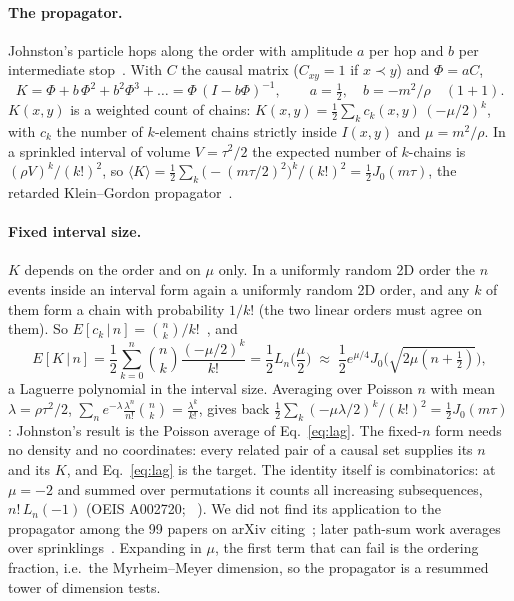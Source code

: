 \documentclass[11pt,a4paper]{article}
\begin{document}
\paragraph{The propagator.} Johnston's particle hops along the order with amplitude $a$ per hop and $b$ per intermediate stop~\cite{Johnston08}. With $C$ the causal matrix ($C_{xy}=1$ if $x\prec y$) and $\Phi=aC$,
\begin{equation}
K=\Phi+b\,\Phi^2+b^2\Phi^3+\dots=\Phi\,(I-b\Phi)^{-1},\qquad a=\tfrac12,\quad b=-m^2/\rho\quad(1+1).
\end{equation}
$K(x,y)$ is a weighted count of chains: $K(x,y)=\tfrac12\sum_k c_k(x,y)\,(-\mu/2)^k$, with $c_k$ the number of $k$-element chains strictly inside $I(x,y)$ and $\mu=m^2/\rho$. In a sprinkled interval of volume $V=\tau^2/2$ the expected number of $k$-chains is $(\rho V)^k/(k!)^2$, so $\langle K\rangle=\tfrac12\sum_k\big(-(m\tau/2)^2\big)^k/(k!)^2=\tfrac12J_0(m\tau)$, the retarded Klein--Gordon propagator~\cite{Johnston08}.

\paragraph{Fixed interval size.} $K$ depends on the order and on $\mu$ only. In a uniformly random 2D order the $n$ events inside an interval form again a uniformly random 2D order, and any $k$ of them form a chain with probability $1/k!$ (the two linear orders must agree on them). So $E[c_k\,|\,n]=\binom nk/k!$~\cite{Pinsky06}, and
\begin{equation}
E[K\,|\,n]=\frac12\sum_{k=0}^n\binom nk\frac{(-\mu/2)^k}{k!}=\frac12L_n\!\Big(\frac\mu2\Big)\;\approx\;\frac12e^{\mu/4}J_0\Big(\sqrt{2\mu(n+\tfrac12)}\Big),
\label{eq:lag}
\end{equation}
a Laguerre polynomial in the interval size. Averaging over Poisson $n$ with mean $\lambda=\rho\tau^2/2$, $\sum_ne^{-\lambda}\frac{\lambda^n}{n!}\binom nk=\frac{\lambda^k}{k!}$, gives back $\tfrac12\sum_k(-\mu\lambda/2)^k/(k!)^2=\tfrac12J_0(m\tau)$: Johnston's result is the Poisson average of Eq.~\eqref{eq:lag}. The fixed-$n$ form needs no density and no coordinates: every related pair of a causal set supplies its $n$ and its $K$, and Eq.~\eqref{eq:lag} is the target. The identity itself is combinatorics: at $\mu=-2$ and summed over permutations it counts all increasing subsequences, $n!\,L_n(-1)$ (OEIS A002720; ~\cite{LifschitzPittel81}). We did not find its application to the propagator among the 99 papers on arXiv citing~\cite{Johnston08,Johnston09}; later path-sum work averages over sprinklings~\cite{Shuman23,KastratiHinrichsen26}. Expanding in $\mu$, the first term that can fail is the ordering fraction, i.e.\ the Myrheim--Meyer dimension, so the propagator is a resummed tower of dimension tests.
\end{document}
